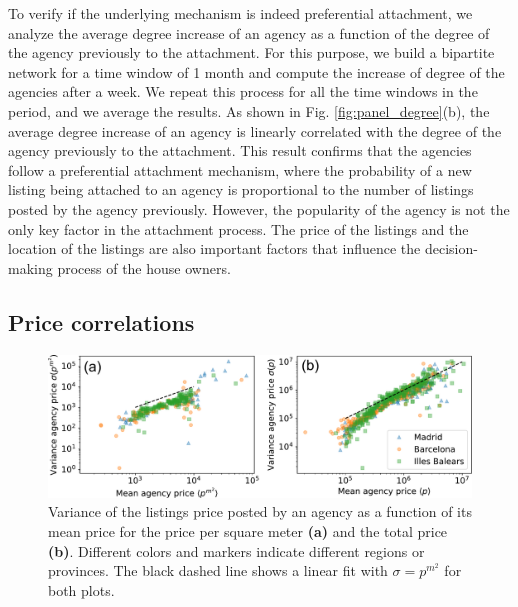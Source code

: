 To verify if the underlying mechanism is indeed preferential attachment, we analyze the average degree increase of an agency as a function of the degree of the agency previously to the attachment. For this purpose, we build a bipartite network for a time window of 1 month and compute the increase of degree of the agencies after a week. We repeat this process for all the time windows in the period, and we average the results. As shown in Fig. \ref{fig:panel_degree}(b), the average degree increase of an agency is linearly correlated with the degree of the agency previously to the attachment. This result confirms that the agencies follow a preferential attachment mechanism, where the probability of a new listing being attached to an agency is proportional to the number of listings posted by the agency previously. However, the popularity of the agency is not the only key factor in the attachment process. The price of the listings and the location of the listings are also important factors that influence the decision-making process of the house owners.

\subsection{Price correlations}



\begin{figure}
    \label{fig:sigma_price}
    \centering
    \includegraphics[width =\textwidth]{Figs/Idealista_dynamics/labeled_sigma_price.pdf}
	\caption[Variance of the agency price vs mean agency price.]{Variance of the listings price posted by an agency as a function of its mean price for the price per square meter \textbf{(a)} and the total price \textbf{(b)}. Different colors and markers indicate different regions or provinces. The black dashed line shows a linear fit with $\sigma = p^{{m}^2}$ for both plots.}
\end{figure}


